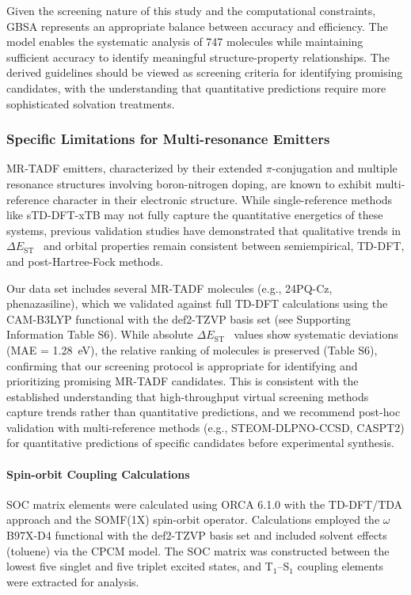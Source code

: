 \documentclass[journal=jcisd8,manuscript=article,keywords=true]{achemso}
\newcommand{\deltaest}{$\Delta E_{\text{ST}}$}
\begin{document}
Given the screening nature of this study and the computational constraints, GBSA represents an appropriate balance between accuracy and efficiency. The model 
enables the systematic analysis of 747 molecules while maintaining sufficient accuracy to identify meaningful structure-property relationships. The derived 
guidelines should be viewed as screening criteria for identifying promising candidates, with the understanding that quantitative predictions require more 
sophisticated solvation treatments.

\subsubsection{Specific Limitations for Multi-resonance Emitters}

MR-TADF emitters, characterized by their extended $\pi$-conjugation and multiple resonance structures involving boron-nitrogen doping, are known to exhibit multi-reference character in their electronic structure.\cite{Hatakeyama2016,Kondo2019} While single-reference methods like sTD-DFT-xTB may not fully capture the quantitative energetics of these systems, previous validation studies have demonstrated that qualitative trends in \deltaest~ and orbital properties remain consistent between semiempirical, TD-DFT, and post-Hartree-Fock methods.\cite{Pershin2019,Olivier2022}

Our data set includes several MR-TADF molecules (e.g., 24PQ-Cz, phenazasiline), which we validated against full TD-DFT calculations using the CAM-B3LYP functional with the def2-TZVP basis set (see Supporting Information Table S6). While absolute \deltaest~ values show systematic deviations (MAE = \qty{1.28}{\electronvolt}), the relative ranking of molecules is preserved (Table S6), confirming that our screening protocol is appropriate for identifying and prioritizing promising MR-TADF candidates. This is consistent with the established understanding that high-throughput virtual screening methods capture trends rather than quantitative predictions,\cite{Gomez-Bombarelli2016} and we recommend post-hoc validation with multi-reference methods (e.g., STEOM-DLPNO-CCSD, CASPT2) for quantitative predictions of specific candidates before experimental synthesis.

\paragraph{Spin-orbit Coupling Calculations}

SOC matrix elements were calculated using ORCA 6.1.0\cite{Neese2022} with the TD-DFT/TDA approach and the SOMF(1X) spin-orbit operator.\cite{Neese2005} Calculations employed the $\omega$B97X-D4 functional\cite{Najibi2018} with the def2-TZVP basis set\cite{Weigend2005} and included solvent effects (toluene) via the CPCM model.\cite{Barone1998} The SOC matrix was constructed between the lowest five singlet and five triplet excited states, and T$_1$--S$_1$ coupling elements were extracted for analysis.
\end{document}
